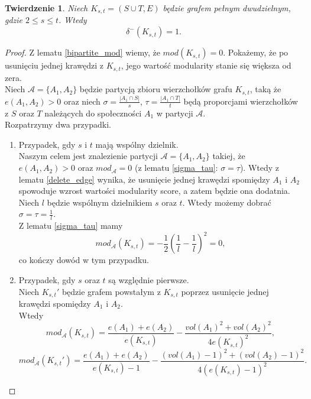 \documentclass[letterpaper,12pt]{article}
\newtheorem{theorem}{Twierdzenie}
\begin{document}
\begin{theorem}
  \cite[Lemma 2.3]{MS23}
  Niech \(K_{s,t}=(S \cup T, E)\) będzie grafem pełnym dwudzielnym, gdzie \(2 \leq s \leq t\). Wtedy
  \[\delta^-(K_{s,t}) = 1.\]
\end{theorem}
\begin{proof}
  Z lematu \ref{bipartite_mod} wiemy, że \(mod(K_{s,t}) = 0\). Pokażemy, że po usunięciu jednej krawędzi z \(K_{s,t}\), jego wartość modularity stanie się większa od zera.\\

  Niech \(\mathcal{A} = \{A_1, A_2\}\) będzie partycją zbioru wierzchołków grafu \(K_{s,t}\), taką że \(e(A_1, A_2) > 0\) oraz niech \(\sigma = \frac{|A_1\cap S|}{s}\), \(\tau = \frac{|A_1 \cap T|}{t}\) będą proporcjami wierzchołków z \(S\) oraz \(T\) należących do społeczności \(A_1\) w partycji \(\mathcal{A}\).\\

  Rozpatrzymy dwa przypadki.
  \begin{enumerate}
    \item Przypadek, gdy \(s\) i \(t\) mają wspólny dzielnik.\\
          Naszym celem jest znalezienie partycji \(\mathcal{A} = \{A_1, A_2\}\) takiej, że \(e(A_1, A_2) > 0\) oraz \(mod_{\mathcal{A}} = 0\) (z lematu \ref{sigma_tau}: \(\sigma = \tau\)). Wtedy z lematu \ref{delete_edge} wynika, że usunięcie jednej krawędzi spomiędzy \(A_1\) i \(A_2\) spowoduje wzrost wartości modularity score, a zatem będzie ona dodatnia.\\

          Niech \(l\) będzie wspólnym dzielnikiem \(s\) oraz \(t\). Wtedy możemy dobrać \(\sigma = \tau = \frac{1}{l}\).\\
          Z lematu \ref{sigma_tau} mamy
          \[mod_{\mathcal{A}}(K_{s,t}) = -\frac{1}{2}\left(\frac{1}{l}-\frac{1}{l}\right)^2 = 0,\]
          co kończy dowód w tym przypadku.
    \item Przypadek, gdy \(s\) oraz \(t\) są względnie pierwsze.\\
          Niech \(K_{s,t}'\) będzie grafem powstałym z \(K_{s,t}\) poprzez usunięcie jednej krawędzi spomiędzy \(A_1\) i \(A_2\).\\
          Wtedy
          \[mod_{\mathcal{A}}(K_{s,t})= \frac{e(A_1)+e(A_2)}{e(K_{s,t})}-\frac{vol(A_1)^2+vol(A_2)^2}{4e(K_{s,t})^2},\]
          \[mod_{\mathcal{A}}(K_{s,t}')= \frac{e(A_1)+e(A_2)}{e(K_{s,t})-1}-\frac{(vol(A_1)-1)^2+(vol(A_2)-1)^2}{4(e(K_{s,t})-1)^2}.\]


\end{enumerate}
\end{proof}
\end{document}
